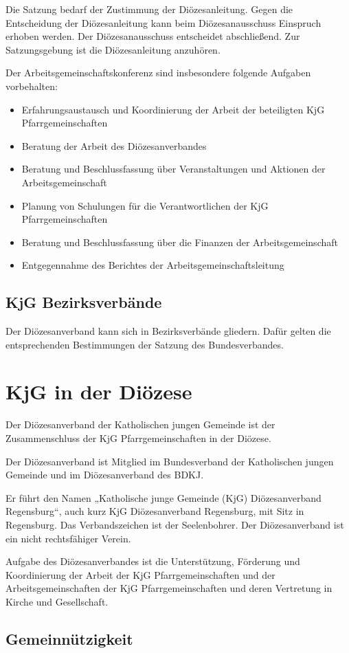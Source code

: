 \documentclass[12pt]{report}
\begin{document}
\begin{flushleft}
Die Satzung bedarf der Zustimmung der Diözesanleitung. Gegen die Entscheidung der Diözesanleitung
kann beim Diözesanausschuss Einspruch erhoben werden. Der Diözesanausschuss entscheidet
abschließend. Zur Satzungsgebung ist die Diözesanleitung
anzuhören.

Der Arbeitsgemeinschaftskonferenz sind insbesondere folgende Aufgaben vorbehalten:
\begin{itemize}
  \item Erfahrungsaustausch und Koordinierung der Arbeit der beteiligten KjG Pfarrgemeinschaften
  \item Beratung der Arbeit des Diözesanverbandes
  \item Beratung und Beschlussfassung über Veranstaltungen und Aktionen der Arbeitsgemeinschaft
  \item Planung von Schulungen für die Verantwortlichen der KjG Pfarrgemeinschaften
  \item Beratung und Beschlussfassung über die Finanzen der Arbeitsgemeinschaft
  \item Entgegennahme des Berichtes der Arbeitsgemeinschaftsleitung
\end{itemize}
\section{KjG Bezirksverbände}
Der Diözesanverband kann sich in Bezirksverbände gliedern. Dafür gelten die entsprechenden
Bestimmungen der Satzung des Bundesverbandes.
\chapter{KjG in der Diözese}
Der Diözesanverband der Katholischen jungen Gemeinde ist der Zusammenschluss der
KjG Pfarrgemeinschaften in der Diözese.

Der Diözesanverband ist Mitglied im Bundesverband der Katholischen jungen Gemeinde und im
Diözesanverband des BDKJ.

Er führt den Namen „Katholische junge Gemeinde (KjG) Diözesanverband Regensburg“,
auch kurz KjG Diözesanverband Regensburg, mit Sitz in Regensburg.
Das Verbandszeichen ist der Seelenbohrer.
Der Diözesanverband ist ein nicht rechtsfähiger Verein.

Aufgabe des Diözesanverbandes ist die Unterstützung, Förderung und Koordinierung der Arbeit
der KjG Pfarrgemeinschaften und der Arbeitsgemeinschaften der KjG Pfarrgemeinschaften und
deren Vertretung in Kirche und Gesellschaft.

\section{Gemeinnützigkeit}


\end{flushleft}
\end{document}
